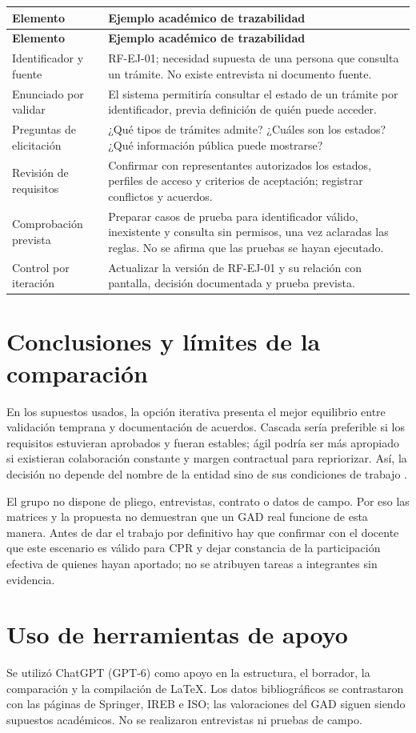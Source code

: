 \documentclass[10pt,a4paper,onecolumn]{IEEEtran}
\begin{document}
\small
\begin{longtable}{@{}p{3.3cm}p{12.6cm}@{}}
\toprule
\textbf{Elemento} & \textbf{Ejemplo académico de trazabilidad}\\
\midrule\endfirsthead
\toprule
\textbf{Elemento} & \textbf{Ejemplo académico de trazabilidad}\\
\midrule\endhead
Identificador y fuente & RF-EJ-01; necesidad supuesta de una persona que consulta un trámite. No existe entrevista ni documento fuente.\\
\midrule
Enunciado por validar & El sistema permitiría consultar el estado de un trámite por identificador, previa definición de quién puede acceder.\\
\midrule
Preguntas de elicitación & ¿Qué tipos de trámites admite? ¿Cuáles son los estados? ¿Qué información pública puede mostrarse?\\
\midrule
Revisión de requisitos & Confirmar con representantes autorizados los estados, perfiles de acceso y criterios de aceptación; registrar conflictos y acuerdos.\\
\midrule
Comprobación prevista & Preparar casos de prueba para identificador válido, inexistente y consulta sin permisos, una vez aclaradas las reglas. No se afirma que las pruebas se hayan ejecutado.\\
\midrule
Control por iteración & Actualizar la versión de RF-EJ-01 y su relación con pantalla, decisión documentada y prueba prevista.\\
\midrule
\end{longtable}
\normalsize

\section{Conclusiones y límites de la comparación}
En los supuestos usados, la opción iterativa presenta el mejor equilibrio entre validación temprana y documentación de acuerdos. Cascada sería preferible si los requisitos estuvieran aprobados y fueran estables; ágil podría ser más apropiado si existieran colaboración constante y margen contractual para repriorizar. Así, la decisión no depende del nombre de la entidad sino de sus condiciones de trabajo \cite{pohl2025,iso2018}.

El grupo no dispone de pliego, entrevistas, contrato o datos de campo. Por eso las matrices y la propuesta no demuestran que un GAD real funcione de esta manera. Antes de dar el trabajo por definitivo hay que confirmar con el docente que este escenario es válido para CPR y dejar constancia de la participación efectiva de quienes hayan aportado; no se atribuyen tareas a integrantes sin evidencia.

\section*{Uso de herramientas de apoyo}
Se utilizó ChatGPT (GPT-6) como apoyo en la estructura, el borrador, la comparación y la compilación de LaTeX. Los datos bibliográficos se contrastaron con las páginas de Springer, IREB e ISO; las valoraciones del GAD siguen siendo supuestos académicos. No se realizaron entrevistas ni pruebas de campo.

\printbibliography
\end{document}
